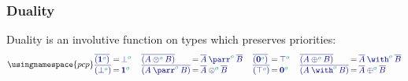 \documentclass[main.tex]{subfiles}
\begin{document}
\subsubsection*{Duality}
Duality is an involutive function on types which preserves priorities:
\[
  \usingnamespace{pcp}
  \setlength{\arraycolsep}{1pt}
  \begin{array}{lcl}
    \ty{\co{(\tyone[\cs{o}])}} & = & \ty{\tybot[\cs{o}]} \\
    \ty{\co{(\tybot[\cs{o}])}} & = & \ty{\tyone[\cs{o}]}
  \end{array}
  \quad
  \begin{array}{lcl}
    \ty{\co{(\tytens[\cs{o}]{A}{B})}} & = & \ty{\typarr[\cs{o}]{\co{A}}{\co{B}}} \\
    \ty{\co{(\typarr[\cs{o}]{A}{B})}} & = & \ty{\tytens[\cs{o}]{\co{A}}{\co{B}}}
  \end{array}
  \quad
  \begin{array}{lcl}
    \ty{\co{(\tynil[\cs{o}])}} & = & \ty{\tytop[\cs{o}]} \\
    \ty{\co{(\tytop[\cs{o}])}} & = & \ty{\tynil[\cs{o}]}
  \end{array}
  \quad
  \begin{array}{lcl}
    \ty{\co{(\typlus[\cs{o}]{A}{B})}} & = & \ty{\tywith[\cs{o}]{\co{A}}{\co{B}}} \\
    \ty{\co{(\tywith[\cs{o}]{A}{B})}} & = & \ty{\typlus[\cs{o}]{\co{A}}{\co{B}}}
  \end{array}
\]
\end{document}
